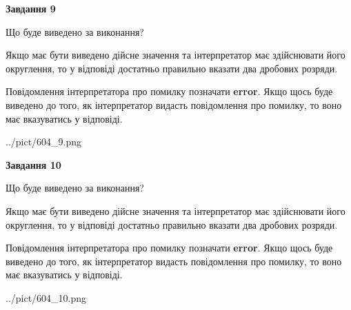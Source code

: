 \documentclass[12pt, ukrainian]{article}
\begin{document}
{\begin {Large}
{\begin {center}\textbf{Завдання 9}\end {center}}\par
Що буде виведено за виконання? \par

Якщо має бути виведено дійсне значення та інтерпретатор має здійснювати його округлення, 
то у відповіді достатньо правильно вказати два дробових розряди.

Повідомлення інтерпретатора про помилку позначати \textbf{error}.
Якщо щось буде виведено до того, як інтерпретатор видасть повідомлення про помилку, 
то воно має вказуватись у відповіді. \par

\begin{center}
	{../pict/604_9.png}
\end{center}
\newpage

{\begin {center}\textbf{Завдання 10}\end {center}}\par
Що буде виведено за виконання? \par

Якщо має бути виведено дійсне значення та інтерпретатор має здійснювати його округлення, 
то у відповіді достатньо правильно вказати два дробових розряди.

Повідомлення інтерпретатора про помилку позначати \textbf{error}.
Якщо щось буде виведено до того, як інтерпретатор видасть повідомлення про помилку, 
то воно має вказуватись у відповіді. \par

\begin{center}
	{../pict/604_10.png}
\end{center}
\newpage

\end {Large}}
\end{document}

